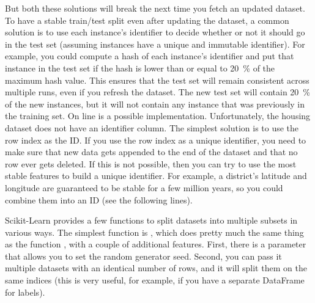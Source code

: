 But both these solutions will break the next time you fetch an updated dataset. To have a stable train/test split even after updating the dataset, a common solution is to use each instance's identifier to decide whether or not it should go in the test set (assuming instances have a unique and immutable identifier). For example, you could compute a hash of each instance’s identifier and put that instance in the test set if the hash is lower than or equal to \SI{20}{\percent} of the maximum hash value. This ensures that the test set will remain consistent across multiple runs, even if you refresh the dataset. The new test set will contain \SI{20}{\percent} of the new instances, but it will not contain any instance that was previously in the training set. On line  is a possible implementation. Unfortunately, the housing dataset does not have an identifier column. The simplest solution is to use the row index as the ID. If you use the row index as a unique identifier, you need to make sure that new data gets appended to the end of the dataset and that no row ever gets deleted. If this is not possible, then you can try to use the most stable features to build a unique identifier. For example, a district's latitude and longitude are guaranteed to be stable for a few million years, so you could combine them into an ID (see the following lines).

Scikit-Learn provides a few functions to split datasets into multiple subsets in various ways. The simplest function is , which does pretty much the same thing as the function , with a couple of additional features. First, there is a  parameter that allows you to set the random generator seed. Second, you can pass it multiple datasets with an identical number of rows, and it will split them on the same indices (this is very useful, for example, if you have a separate DataFrame for labels).

